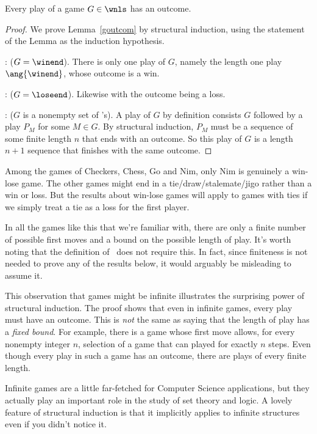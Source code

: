 \begin{definition}
\begin{lemma}\label{goutcom}
Every play of a game $G \in \wnls$ has an outcome.
\end{lemma}

\begin{proof}
We prove Lemma~\ref{goutcom} by structural induction, using the
statement of the Lemma as the induction hypothesis.

: ($G = \winend$).  There is only one play of
$G$, namely the length one play $\ang{\winend}$, whose outcome is a
win.

: ($G= \loseend$).  Likewise with the outcome
being a loss.

: ($G$ is a nonempty set of \wnls's).
A play of $G$ by definition consists $G$ followed by a play $P_M$ for
some $M \in G$.  By structural induction, $P_M$ must be a sequence of
some finite length $n$ that ends with an outcome.  So this play of $G$
is a length $n+1$ sequence that finishes with the same outcome.
\end{proof}

Among the games of Checkers, Chess, Go and Nim, only Nim is genuinely
a win-lose game.  The other games might end in a
tie/draw/stalemate/jigo rather than a win or loss.  But the results
about win-lose games will apply to games with ties if we simply treat
a tie as a loss for the first player.

In all the games like this that we're familiar with, there are only a
finite number of possible first moves and a bound on the possible
length of play.  It's worth noting that the definition of \wnls\ does
not require this.  In fact, since finiteness is not needed to prove
any of the results below, it would arguably be misleading to assume
it.

This observation that games might be infinite illustrates the
surprising power of structural induction.  The proof shows that even
in infinite games, every play must have an outcome.  This is
\emph{not} the same as saying that the length of play has a
\emph{fixed bound}.  For example, there is a game whose first move
allows, for every nonempty integer $n$, selection of a game that can
played for exactly $n$ steps.  Even though every play in such a game
has an outcome, there are plays of every finite length.

Infinite games are a little far-fetched for Computer Science
applications, but they actually play an important role in the study of
set theory and logic.  A lovely feature of structural induction is
that it implicitly applies to infinite structures even if you didn't
notice it.


\end{definition}
